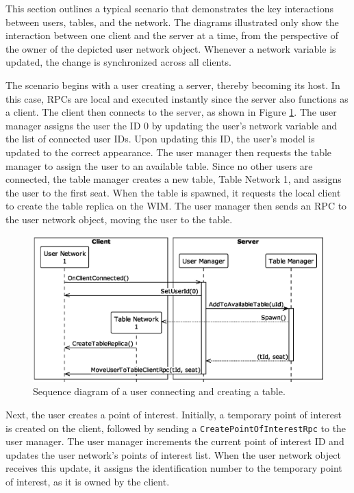         This section outlines a typical scenario that demonstrates the key interactions between users, tables, and the network. The diagrams illustrated only show the interaction between one client and the server at a time, from the perspective of the owner of the depicted user network object. Whenever a network variable is updated, the change is synchronized across all clients.

        The scenario begins with a user creating a server, thereby becoming its host. In this case, RPCs are local and executed instantly since the server also functions as a client. The client then connects to the server, as shown in Figure \ref{fig:connect_and_create}. The user manager assigns the user the ID 0 by updating the user's network variable and the list of connected user IDs. Upon updating this ID, the user's model is updated to the correct appearance. The user manager then requests the table manager to assign the user to an available table. Since no other users are connected, the table manager creates a new table, Table Network 1, and assigns the user to the first seat. When the table is spawned, it requests the local client to create the table replica on the WIM. The user manager then sends an RPC to the user network object, moving the user to the table.

        \begin{figure}[h]
            \centering
            \includegraphics[width=.85\linewidth]{diagrams/out/connect_and_create_table.eps}
            \caption{Sequence diagram of a user connecting and creating a table.}
            \label{fig:connect_and_create}
        \end{figure}

        Next, the user creates a point of interest. Initially, a temporary point of interest is created on the client, followed by sending a \lstinline{CreatePointOfInterestRpc} to the user manager. The user manager increments the current point of interest ID and updates the user network's points of interest list. When the user network object receives this update, it assigns the identification number to the temporary point of interest, as it is owned by the client.

